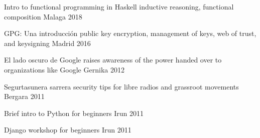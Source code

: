 \documentclass[11pt, a4paper]{awesome-cv}
\begin{document}
\begin{cvhonors}
    \cvhonor
      {Intro to functional programming in Haskell}
      {inductive reasoning, functional composition}
      {Malaga} %
      {2018} %

    \cvhonor
      {GPG: Una introducción}
      {public key encryption, management of keys, web of trust, and keysigning}
      {Madrid} %
      {2016} %

    \cvhonor
      {El lado oscuro de Google} %
      {raises awareness of the power handed over to organizations like Google}
      {Gernika}
      {2012}
  
    \cvhonor
      {Segurtasunera sarrera} %
      {security tips for libre radios and grassroot movements}
      {Bergara} %
      {2011} %
  
    \cvhonor
      {Brief intro to Python}
      {for beginners}
      {Irun}
      {2011}

    \cvhonor
      {Django workshop}
      {for beginners}
      {Irun}
      {2011}
\end{cvhonors}
\end{document}
